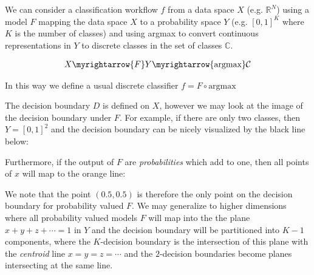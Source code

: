 We can consider a classification workflow $f$ from a data space $X$ (e.g. $\mathbb{R}^N$) using a model $F$ mapping the data space $X$ to a probability space $Y$ (e.g. $[0,1]^K$ where $K$ is the number of classes) and using argmax to convert continuous representations in $Y$ to discrete classes in the set of classes $\mathbb{C}$. 

\begin{align}
    X \myrightarrow{F} Y \myrightarrow{\text{argmax}} \mathcal{C}
\end{align}

In this way we define a usual discrete classifier $f = F \circ \text{argmax}$ 

The decision boundary $D$ is defined on $X$, however we may look at the image of the decision boundary under $F$. For example, if there are only two classes, then $Y = [0,1]^2$ and the decision boundary can be nicely visualized by the black line below: 


Furthermore, if the output of $F$ are \emph{probabilities} which add to one, then all points of $x$ will map to the orange line:


We note that the point $(0.5, 0.5)$ is therefore the only point on the decision boundary for probability valued $F$. We may generalize to higher dimensions where all probability valued models $F$ will map into the the plane $x + y + z + \cdots = 1$ in $Y$ and the decision boundary will be partitioned into $K-1$ components, where the $K$-decision boundary is the intersection of this plane with the \emph{centroid} line $x = y = z = \cdots$ and the $2$-decision boundaries become planes intersecting at the same line. 

